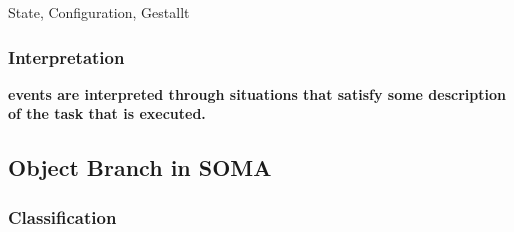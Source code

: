 \begin{ODP}{State, Configuration, Gestallt}
\end{ODP}

\subsubsection{Interpretation}
\textbf{events are interpreted through situations that satisfy some description of the task that is executed.}

\subsection{Object Branch in SOMA}

\subsubsection{Classification}

